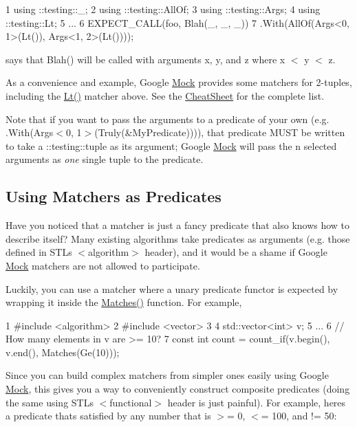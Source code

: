 \begin{DoxyCode}
1 using ::testing::\_;
2 using ::testing::AllOf;
3 using ::testing::Args;
4 using ::testing::Lt;
5 ...
6   EXPECT\_CALL(foo, Blah(\_, \_, \_))
7       .With(AllOf(Args<0, 1>(Lt()), Args<1, 2>(Lt())));
\end{DoxyCode}


says that {\ttfamily Blah()} will be called with arguments {\ttfamily x}, {\ttfamily y}, and {\ttfamily z} where {\ttfamily x $<$ y $<$ z}.

As a convenience and example, Google \hyperlink{class_mock}{Mock} provides some matchers for 2-\/tuples, including the {\ttfamily \hyperlink{namespacetesting_ad621459957a8bcdd3c256b7940ecbf99}{Lt()}} matcher above. See the \hyperlink{v1__7_2_cheat_sheet_8md}{Cheat\+Sheet} for the complete list.

Note that if you want to pass the arguments to a predicate of your own (e.\+g. {\ttfamily .With(Args$<$0, 1$>$(Truly(\&\+My\+Predicate)))}), that predicate M\+U\+ST be written to take a {\ttfamily \+::testing\+::tuple} as its argument; Google \hyperlink{class_mock}{Mock} will pass the {\ttfamily n} selected arguments as {\itshape one} single tuple to the predicate.

\subsection*{Using Matchers as Predicates}

Have you noticed that a matcher is just a fancy predicate that also knows how to describe itself? Many existing algorithms take predicates as arguments (e.\+g. those defined in S\+TL\textquotesingle{}s {\ttfamily $<$algorithm$>$} header), and it would be a shame if Google \hyperlink{class_mock}{Mock} matchers are not allowed to participate.

Luckily, you can use a matcher where a unary predicate functor is expected by wrapping it inside the {\ttfamily \hyperlink{namespacetesting_ad53b509ae9cd51040d67f668f99702ae}{Matches()}} function. For example,


\begin{DoxyCode}
1 #include <algorithm>
2 #include <vector>
3 
4 std::vector<int> v;
5 ...
6 // How many elements in v are >= 10?
7 const int count = count\_if(v.begin(), v.end(), Matches(Ge(10)));
\end{DoxyCode}


Since you can build complex matchers from simpler ones easily using Google \hyperlink{class_mock}{Mock}, this gives you a way to conveniently construct composite predicates (doing the same using S\+TL\textquotesingle{}s {\ttfamily $<$functional$>$} header is just painful). For example, here\textquotesingle{}s a predicate that\textquotesingle{}s satisfied by any number that is $>$= 0, $<$= 100, and != 50\+:



